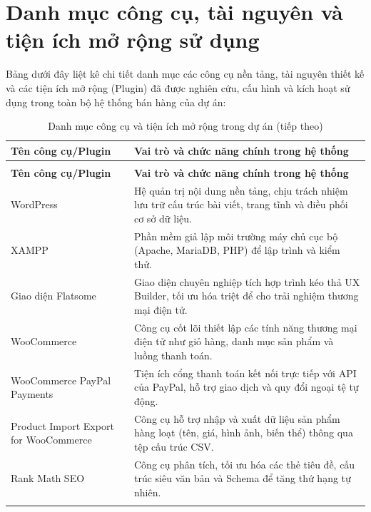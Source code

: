 \newpage
\section*{Danh mục công cụ, tài nguyên và tiện ích mở rộng sử dụng}

Bảng dưới đây liệt kê chi tiết danh mục các công cụ nền tảng, tài nguyên thiết kế và các tiện ích mở rộng (Plugin) đã được nghiên cứu, cấu hình và kích hoạt sử dụng trong toàn bộ hệ thống bán hàng của dự án:

\begin{longtable}{>{\raggedright\arraybackslash}p{4.5cm}>{\raggedright\arraybackslash}p{10.5cm}}
\caption{Danh mục công cụ và tiện ích mở rộng trong dự án}\label{tab:project_tools} \\
\toprule
\textbf{Tên công cụ/Plugin} & \textbf{Vai trò và chức năng chính trong hệ thống} \\ \midrule
\endfirsthead
\caption[]{Danh mục công cụ và tiện ích mở rộng trong dự án (tiếp theo)} \\
\toprule
\textbf{Tên công cụ/Plugin} & \textbf{Vai trò và chức năng chính trong hệ thống} \\ \midrule
\endhead
WordPress & Hệ quản trị nội dung nền tảng, chịu trách nhiệm lưu trữ cấu trúc bài viết, trang tĩnh và điều phối cơ sở dữ liệu. \\ \addlinespace
XAMPP & Phần mềm giả lập môi trường máy chủ cục bộ (Apache, MariaDB, PHP) để lập trình và kiểm thử. \\ \addlinespace
Giao diện Flatsome \cite{theme_flatsome} & Giao diện chuyên nghiệp tích hợp trình kéo thả UX Builder, tối ưu hóa triệt để cho trải nghiệm thương mại điện tử. \\ \addlinespace
WooCommerce \cite{plugin_woocommerce} & Công cụ cốt lõi thiết lập các tính năng thương mại điện tử như giỏ hàng, danh mục sản phẩm và luồng thanh toán. \\ \addlinespace
WooCommerce PayPal Payments \cite{plugin_paypal} & Tiện ích cổng thanh toán kết nối trực tiếp với API của PayPal, hỗ trợ giao dịch và quy đổi ngoại tệ tự động. \\ \addlinespace
Product Import Export for WooCommerce \cite{plugin_product_import} & Công cụ hỗ trợ nhập và xuất dữ liệu sản phẩm hàng loạt (tên, giá, hình ảnh, biến thể) thông qua tệp cấu trúc CSV. \\ \addlinespace
Rank Math SEO \cite{plugin_rankmath} & Công cụ phân tích, tối ưu hóa các thẻ tiêu đề, cấu trúc siêu văn bản và Schema để tăng thứ hạng tự nhiên. \\ \addlinespace

\end{longtable}
